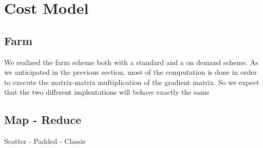\section{Cost Model}

\subsection{Farm}

We realized the farm scheme both with a standard and a on demand scheme.
As we anticipated in the previous section, most of the computation is done in order to execute the matrix-matrix multiplication of the gradient matrix.
So we expect that the two different implentations will behave exactly the same

\subsection{Map - Reduce}

Scatter - Padded - Classis